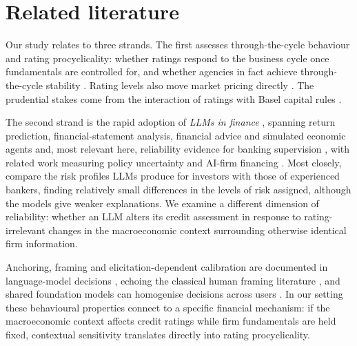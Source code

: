 \documentclass[a4paper,fleqn]{cas-sc}
\begin{document}
\section{Related literature}\label{sec:lit}
Our study relates to three strands. The first assesses through-the-cycle behaviour and rating
procyclicality: whether ratings respond to the business cycle once fundamentals are controlled for,
and whether agencies in fact achieve through-the-cycle stability
\citep{amato2004,loffler2004,loffler2013}. Rating levels also move market pricing directly
\citep{cantor1996}. The prudential stakes come from the interaction of ratings
with Basel capital rules \citep{kashyap2004,gordy2006}.

The second strand is the rapid adoption of \emph{LLMs in finance}
\citep{ali2025}, spanning return prediction, financial-statement analysis, financial advice and
simulated economic agents \citep{lopezlira2023,kim2024,fieberg2025,horton2023}
and, most relevant here, reliability evidence for banking supervision \citep{garcia2026},
with related work measuring policy uncertainty and AI-firm financing
\citep{ito2025,giaretta2026}. Most closely, \citet{hens2025} compare the risk profiles LLMs produce for investors
with those of experienced bankers, finding relatively small differences in the levels of risk
assigned, although the models give weaker explanations. We examine a different dimension of reliability: whether an LLM alters its credit assessment in response to rating-irrelevant
changes in the macroeconomic context surrounding otherwise identical firm information.

Anchoring, framing and elicitation-dependent calibration are documented in language-model decisions
\citep{binz2023,kadavath2022}, echoing the classical human framing literature
\citep{tversky1974,tversky1981}, and shared foundation models can homogenise decisions across
users \citep{bommasani2022}. In our setting these behavioural properties
connect to a specific financial mechanism: if the macroeconomic context affects credit ratings while firm
fundamentals are held fixed, contextual sensitivity translates directly into rating procyclicality.
\end{document}
